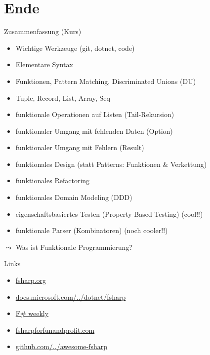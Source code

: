 \documentclass[t]{beamer}
\begin{document}
\section{Ende }
\label{sec:orgf25ce23}
\begin{frame}[label={sec:orgc00daf5}]{Zusammenfassung (Kurs)}
\begin{itemize}
\item Wichtige Werkzeuge (git, dotnet, code)
\item Elementare Syntax
\item Funktionen, Pattern Matching, Discriminated Unions (DU)
\item Tuple, Record, List, Array, Seq
\item funktionale Operationen auf Listen (Tail-Rekursion)
\item funktionaler Umgang mit fehlenden Daten (Option)
\item funktionaler Umgang mit Fehlern (Result)
\item funktionales Design (statt Patterns: Funktionen \& Verkettung)
\item funktionales Refactoring
\item funktionales Domain Modeling (DDD)
\item eigenschaftsbasiertes Testen (Property Based Testing) (cool!!)
\item funktionale Parser (Kombinatoren) (noch cooler!!)
\end{itemize}
\(\leadsto\) \alert{\alert{Was ist Funktionale Programmierung?}}
\end{frame}

\begin{frame}[label={sec:org8ec9bd2}]{Links}
\begin{itemize}
\item \href{https://fsharp.org/}{fsharp.org}
\item \href{https://docs.microsoft.com/de-de/dotnet/fsharp/}{docs.microsoft.com/../dotnet/fsharp}
\item \href{https://sergeytihon.com/}{F\# weekly}
\item \href{https://fsharpforfunandprofit.com/}{fsharpforfunandprofit.com}
\item \href{https://github.com/fsprojects/awesome-fsharp}{github.com/../awesome-fsharp}
\end{itemize}
\end{frame}
\end{document}
